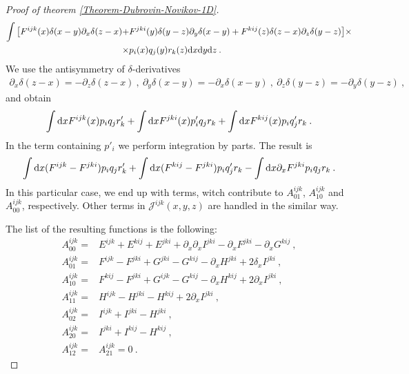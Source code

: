 \begin{proof}[Proof of theorem \ref{Theorem-Dubrovin-Novikov-1D}]
    \begin{align*}
        \int \big[ F^{ijk}(x) \delta(x-y) \partial_x \delta(z-x) 
        +& F^{jki}(y) \delta(y-z) \partial_y \delta(x-y) 
        + F^{kij}(z) \delta(z-x) \partial_z \delta(y-z) \big] \times \\ 
        \times&  p_i(x) q_j(y) r_k(z) \mathrm{d} x \mathrm{d} y \mathrm{d} z \:.
    \end{align*}
    We use the antisymmetry of $\delta$-derivatives
    \begin{align*}
        \partial_x \delta(z-x) = - \partial_z \delta (z-x) \:, \:
        \partial_y \delta(x-y) = - \partial_x \delta(x-y) \:, \: 
        \partial_z \delta(y-z) = - \partial_y \delta (y-z) \:,
    \end{align*}
    and obtain
    \begin{align*}
        \int \mathrm{d} x F^{ijk}(x) p_i q_j r'_k + \int \mathrm{d} x F^{jki}(x)  p'_i q_j r_k +
        \int \mathrm{d} x F^{kij}(x) p_i q'_j r_k \:.
    \end{align*}
    In the term containing $p'_i$ we perform integration by parts. The result is
    \begin{align*}
        \int \mathrm{d} x (F^{ijk}-F^{jki}) p_i q_j  r'_k +
        \int \mathrm{d} x (F^{kij}-F^{jki}) p_i q'_j r_k -
        \int \mathrm{d} x \partial_x F^{jki} p_i q_j r_k \:.
    \end{align*}
    In this particular case, we end up with terms, witch contribute to $A^{ijk}_{01}$, $A^{ijk}_{10}$ and $A^{ijk}_{00}$, respectively. Other terms in $\mathcal J^{ijk}(x,y,z)$ are handled in the similar way.

    The list of the resulting functions is the following:
    \begin{align}
        A_{00}^{ijk} =& E^{ijk} + E^{kij} + E^{jki} + \partial_x \partial_x I^{jki} - \partial_x F^{jki} - \partial_x G^{kij} \:, \\
        A_{01}^{ijk} =& F^{ijk} - F^{jki} + G^{jki} - G^{kij} - \partial_x H^{jki} + 2 \delta_x I^{jki} \:, \\
        A_{10}^{ijk} =& F^{kij} - F^{jki} + G^{ijk} - G^{kij} - \partial_x H^{kij} + 2 \partial_x I^{jki} \:, \\
        A_{11}^{ijk} =& H^{ijk} - H^{jki} - H^{kij} + 2 \partial_x I^{jki} \:, \\
        A_{02}^{ijk} =& I^{ijk} + I^{jki} - H^{jki}\:, \\
        A_{20}^{ijk} =& I^{jki} + I^{kij} - H^{kij}\:, \\
        A^{ijk}_{12} =& A^{ijk}_{21} = 0 \:.
    \end{align}
    

\end{proof}

